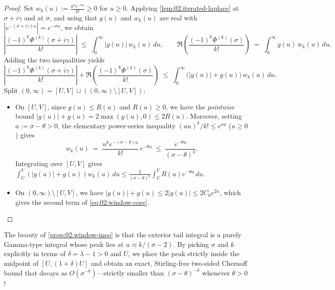 \begin{proof}
Set $w_k(u) := \frac{u^k e^{-\sigma u}}{k!} \ge 0$ for $u \ge 0$. Applying \cref{lem:02:iterated-laplace} at $\sigma + i\gamma$ and at $\sigma$, and using that $g(u)$ and $w_k(u)$ are real with $|e^{-(\sigma + i\gamma)u}| = e^{-\sigma u}$, we obtain
\[
  \left|\frac{(-1)^k \Phi^{(k)}(\sigma + i\gamma)}{k!}\right|
  \;\le\; \int_0^\infty |g(u)|\, w_k(u)\,du,
  \qquad
  \Re\!\left(\frac{(-1)^k \Phi^{(k)}(\sigma)}{k!}\right)
  \;=\; \int_0^\infty g(u)\, w_k(u)\,du.
\]
Adding the two inequalities yields
\[
  \left|\frac{(-1)^k \Phi^{(k)}(\sigma + i\gamma)}{k!}\right|
  + \Re\!\left(\frac{(-1)^k \Phi^{(k)}(\sigma)}{k!}\right)
  \;\le\; \int_0^\infty \bigl(|g(u)| + g(u)\bigr)\, w_k(u)\,du.
\]
Split $(0, \infty) = [U, V] \sqcup ((0, \infty) \setminus [U, V])$:
\begin{itemize}
\item On $[U, V]$, since $g(u) \le R(u)$ and $R(u) \ge 0$, we have the \emph{pointwise} bound $|g(u)| + g(u) = 2\max(g(u), 0) \le 2R(u)$. Moreover, setting $a := \sigma - \theta > 0$, the elementary power-series inequality $(au)^k / k! \le e^{au}$ ($u \ge 0$) gives
  \[
    w_k(u) \;=\; \frac{u^k e^{-(\sigma-\theta)u}}{k!}\, e^{-\theta u} \;\le\; \frac{e^{-\theta u}}{(\sigma - \theta)^k}.
  \]
  Integrating over $[U, V]$ gives $\int_U^V (|g(u)| + g(u)) w_k(u)\,du \le \frac{2}{(\sigma-\theta)^k}\int_U^V R(u) e^{-\theta u}\,du$.
\item On $(0, \infty) \setminus [U, V]$, we have $|g(u)| + g(u) \le 2|g(u)| \le 2C_0 e^{2u}$, which gives the second term of \eqref{eq:02:window-core}. \qedhere
\end{itemize}
\end{proof}

The beauty of \cref{prop:02:window-ineq} is that the exterior tail integral is a purely Gamma-type integral whose peak lies at $u \approx k / (\sigma - 2)$. By picking $\sigma$ and $k$ explicitly in terms of $\delta = \lambda - 1 > 0$ and $U$, we place the peak strictly inside the midpoint of $[U, (1+\delta)U]$ and obtain an exact, Stirling-free two-sided Chernoff bound that decays as $O(\sigma^{-k})$—strictly smaller than $(\sigma - \theta)^{-k}$ whenever $\theta > 0$!

